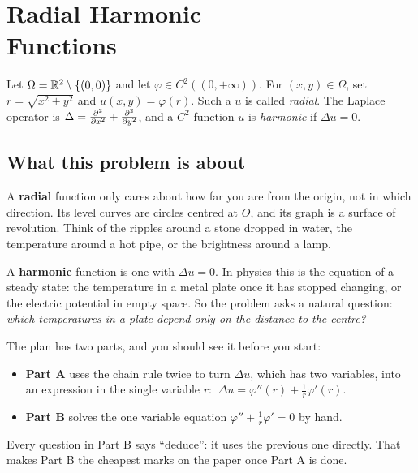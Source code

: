 \chapter[Problem 3: Radial Harmonic Functions]{Radial Harmonic\\ Functions}\label{ch:p3}

\begin{examnote}[title={Problem 3 \;·\; 5 points}]
Let $\Omega=\mathbb{R}^2\setminus\{(0,0)\}$ and let $\varphi\in C^2((0,+\infty))$. For $(x,y)\in\Omega$, set
$r=\sqrt{x^2+y^2}$ and $u(x,y)=\varphi(r)$. Such a $u$ is called \emph{radial}. The Laplace operator is
$\Delta=\frac{\partial^2 }{\partial x^2}+\frac{\partial^2 }{\partial y^2}$, and a $C^2$ function $u$ is \emph{harmonic} if $\Delta u=0$.
\end{examnote}

\section{What this problem is about}

A \textbf{radial} function only cares about how far you are from the origin, not in which direction.
Its level curves are circles centred at $O$, and its graph is a surface of revolution. Think of the
ripples around a stone dropped in water, the temperature around a hot pipe, or the brightness around
a lamp.

A \textbf{harmonic} function is one with $\Delta u=0$. In physics this is the equation of a steady
state: the temperature in a metal plate once it has stopped changing, or the electric potential in
empty space. So the problem asks a natural question: \emph{which temperatures in a plate depend only on
the distance to the centre?}

The plan has two parts, and you should see it before you start:
\begin{itemize}
  \item \textbf{Part A} uses the chain rule twice to turn $\Delta u$, which has two variables, into an
        expression in the single variable $r$: $\ \Delta u=\varphi''(r)+\frac1r\varphi'(r)$.
  \item \textbf{Part B} solves the one variable equation $\varphi''+\frac1r\varphi'=0$ by hand.
\end{itemize}
Every question in Part B says ``deduce'': it uses the previous one directly. That makes Part B the
cheapest marks on the paper once Part A is done.

